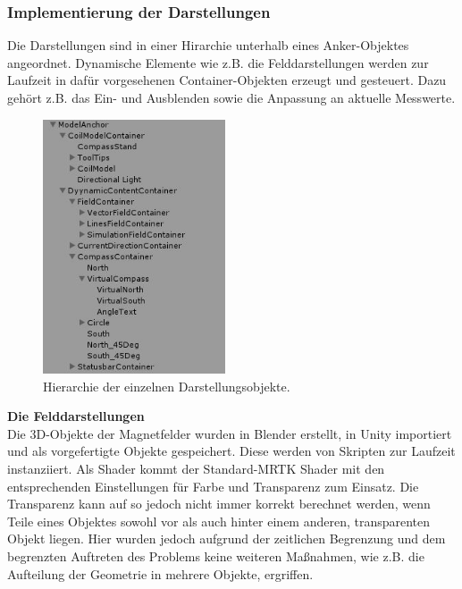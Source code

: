 \subsubsection{Implementierung der Darstellungen}
\label{sec-5-2-2}
Die Darstellungen sind in einer Hirarchie unterhalb eines Anker-Objektes angeordnet. Dynamische Elemente wie z.B. die Felddarstellungen werden zur Laufzeit in dafür vorgesehenen Container-Objekten erzeugt und gesteuert. Dazu gehört z.B. das Ein- und Ausblenden sowie die Anpassung an aktuelle Messwerte.\\

\begin{figure}
	\centering
	\includegraphics[width=0.48\textwidth]{images/unity/hirarchy.jpg}
	\caption{Hierarchie der einzelnen Darstellungsobjekte.}
	\label{img:hirarch}
\end{figure}

\textbf{Die Felddarstellungen}\\
Die 3D-Objekte der Magnetfelder wurden in Blender erstellt, in Unity importiert und als vorgefertigte Objekte gespeichert. Diese werden von Skripten zur Laufzeit instanziiert. Als Shader kommt der Standard-MRTK Shader mit den entsprechenden Einstellungen für Farbe und Transparenz zum Einsatz. Die Transparenz kann auf so jedoch nicht immer korrekt berechnet werden, wenn Teile eines Objektes sowohl vor als auch hinter einem anderen, transparenten Objekt liegen. Hier wurden jedoch aufgrund der zeitlichen Begrenzung und dem begrenzten Auftreten des Problems keine weiteren Maßnahmen, wie z.B. die Aufteilung der Geometrie in mehrere Objekte, ergriffen.\\

